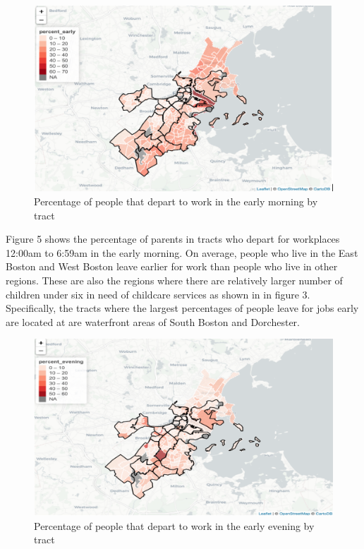 \documentclass[10pt,letterpaper]{article}
\begin{document}
\begin{figure}

{\centering \includegraphics[width=1\linewidth]{fig4} 

}

\caption{Percentage of people that depart to work in the early morning by tract}\label{fig:unnamed-chunk-11}
\end{figure}

Figure 5 shows the percentage of parents in tracts who depart for
workplaces 12:00am to 6:59am in the early morning. On average, people
who live in the East Boston and West Boston leave earlier for work than
people who live in other regions. These are also the regions where there
are relatively larger number of children under six in need of childcare
services as shown in in figure 3. Specifically, the tracts where the
largest percentages of people leave for jobs early are located at are
waterfront areas of South Boston and Dorchester.

\begin{figure}

{\centering \includegraphics[width=1\linewidth]{fig5} 

}

\caption{Percentage of people that depart to work in the early evening by tract}\label{fig:unnamed-chunk-12}
\end{figure}
\end{document}
